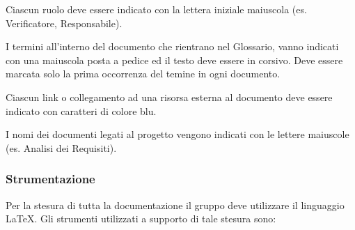 
				Ciascun ruolo deve essere indicato con la lettera iniziale maiuscola (es. Verificatore,
				Responsabile).
				

				I termini all'interno del documento che rientrano nel Glossario, vanno indicati 
				con una \glossaryItem{} maiuscola posta a pedice ed il testo deve essere in corsivo. 
				Deve essere marcata solo la prima occorrenza del temine in ogni documento.

			 \label{regoleRef}

				Ciascun link o collegamento ad una risorsa esterna al documento deve essere indicato
				con caratteri di colore blu.


				I nomi dei documenti legati al progetto vengono indicati con le lettere maiuscole
				(es. Analisi dei Requisiti).

		\subsubsection{Strumentazione}

			Per la stesura di tutta la documentazione il gruppo deve utilizzare il linguaggio \LaTeX{}.
			Gli strumenti utilizzati a supporto di tale stesura sono:

